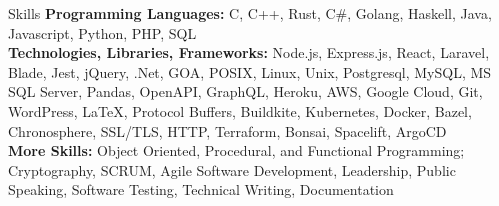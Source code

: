 \documentclass{resume} %
\begin{document}
\begin{rSection}{Skills}
    {\textbf{Programming Languages:} } C, C++, Rust, C\#, Golang, Haskell, Java, Javascript, Python, PHP, SQL
    \\{\textbf{Technologies, Libraries, Frameworks:} }
    Node.js, Express.js, React, Laravel, Blade, Jest, jQuery, .Net,
    GOA, POSIX, Linux, Unix, Postgresql, MySQL, MS SQL Server, Pandas, OpenAPI,
    GraphQL, Heroku, AWS, Google Cloud, Git, WordPress, LaTeX, Protocol Buffers, Buildkite, Kubernetes, Docker, Bazel, Chronosphere,
    SSL/TLS, HTTP, Terraform, Bonsai, Spacelift, ArgoCD
    \\{\textbf{More Skills:} } Object Oriented, Procedural, and Functional Programming; Cryptography, SCRUM, Agile Software Development, Leadership, Public Speaking, Software Testing, Technical Writing, Documentation
\end{rSection}
    
\end{document}
